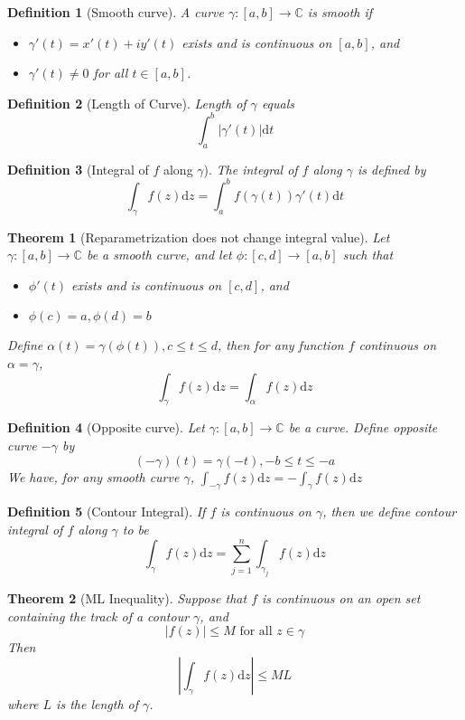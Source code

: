 \documentclass[12pt]{article}
\newcommand{\diff}{\mathrm{d}}
\newtheorem{definition}{Definition}[section]
\newtheorem{theorem}{Theorem}[section]
\theoremstyle{definition}
\begin{document}
\begin{definition}[Smooth curve]
\normalfont A curve $\gamma:[a,b]\to\mathbb{C}$ is smooth if 
\begin{itemize}
	\item $\gamma'(t)=x'(t)+iy'(t)$ exists and is continuous on $[a,b]$, and
	\item $\gamma'(t)\neq 0$ for all $t\in [a,b]$.
\end{itemize}
\end{definition}
\begin{definition}[Length of Curve]
\normalfont Length of $\gamma$ equals 
\[
\int_a^b |\gamma'(t)|\diff t
\]
\end{definition}
\begin{definition}[Integral of {$f$} along {$\gamma$}]
\normalfont The integral of $f$ along $\gamma$ is defined by
\[
\int_\gamma f(z)\diff z = \int_a^b f(\gamma(t))\gamma'(t)\diff t
\]
\end{definition}
\begin{theorem}[Reparametrization does not change integral value]
\normalfont Let $\gamma:[a,b]\to\mathbb{C}$ be a smooth curve, and let $\phi:[c,d]\to [a,b]$ such that 
\begin{itemize}
	\item $\phi'(t)$ exists and is continuous on $[c,d]$, and
	\item $\phi(c) = a, \phi(d) = b$
\end{itemize}
Define $\alpha(t)=\gamma(\phi(t)), c\leq t \leq d$, then for any function $f$ continuous on $\alpha = \gamma$,
\[
\int_\gamma f(z)\diff z = \int_\alpha f(z)\diff z
\]
\end{theorem}
\begin{definition}[Opposite curve]
Let $\gamma:[a,b]\to\mathbb{C}$ be a curve. Define opposite curve $-\gamma$ by
\[
(-\gamma)(t)=\gamma(-t), -b\leq t\leq -a
\]
We have, for any smooth curve $\gamma$, $\int_{-\gamma}f(z)\diff z = -\int_\gamma f(z)\diff z$
\end{definition}
\begin{definition}[Contour Integral]
\normalfont If $f$ is continuous on $\gamma$, then we define contour integral of $f$ along $\gamma$ to be
\[
\int_\gamma f(z)\diff z = \sum_{j=1}^n\int_{\gamma_j}f(z)\diff z
\]
\end{definition}
\begin{theorem}[ML Inequality]
\normalfont Suppose that $f$ is continuous on an open set containing the track of a contour $\gamma$, and
\[
|f(z)|\leq M \text{ for all }z\in \gamma
\]
Then 
\[
|\int_\gamma f(z)\diff z|\leq ML
\]
where $L$ is the length of $\gamma$.
\end{theorem}
\end{document}
